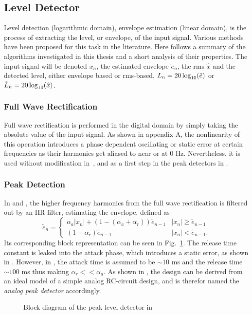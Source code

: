 \documentclass[../main2.tex]{subfiles}
\providecommand{\rootdir}{..}
\begin{document}
\subsection{Level Detector}\label{level_detection}
Level detection (logarithmic domain), envelope estimation (linear domain), is the process of extracting the level, or envelope, of the input signal. Various methods have been proposed for this task in the literature. Here follows a summary of the algorithms investigated in this thesis and a short analysis of their properties. The input signal will be denoted $x_n$, the estimated envelope $\tilde{e}_n$, the rms $\hat{x}$ and the detected level, either envelope based or rms-based, $L_n = 20\log_{10}(\tilde{e})$ or $\hat{L}_n=20\log_{10}(\hat{x})$. 

\subsubsection{Full Wave Rectification}
Full wave rectification is performed in the digital domain by simply taking the absolute value of the input signal. As shown in appendix A, the nonlinearity of this operation introduces a phase dependent oscillating or static error at certain frequencies as their harmonics get aliased to near or at 0 Hz. Nevertheless, it is used without modification in~\cite{reiss2012tutorial}, and as a first step in the peak detectors in \cite{mcnally1984dynamic} \cite{stikvoort1986digital}. \subsubsection{Peak Detection}\label{peak_detection}
In \cite{mcnally1984dynamic} and \cite{zolzer1997digital}, the higher frequency harmonics from the full wave rectification is filtered out by an IIR-filter, estimating the envelope, defined as
\begin{equation}
\tilde{e}_n = \begin{cases}
    \alpha_{a} |x_n| + (1- (\alpha_{a} + \alpha_{r})) \tilde{e}_{n-1}  	& |x_n| \geq \tilde{e}_{n-1} \\
    (1-\alpha_{r}) \tilde{e}_{n-1} 							& |x_n| < \tilde{e}_{n-1}.
\end{cases}
\end{equation}
Its corresponding block representation can be seen in Fig.~\ref{fig:block_mcnally_theory_peak}. The release time constant is leaked into the attack phase, which introduces a static error, as shown in \cite{reiss2012tutorial}. However, in \cite{mcnally1984dynamic}, the attack time is assumed to be $\sim 10$ ms and the release time   $\sim 100$ ms thus making $\alpha_r << \alpha_a$. As shown in \cite{reiss2012tutorial}, the design can be derived from an ideal model of a simple analog RC-circuit design, and is therefor named the \emph{analog peak detector} accordingly.
\begin{figure}
\centerline{}
\caption{Block diagram of the peak level detector in \cite{mcnally1984dynamic}}
\label{fig:block_mcnally_theory_peak}
\end{figure}
\end{document}
